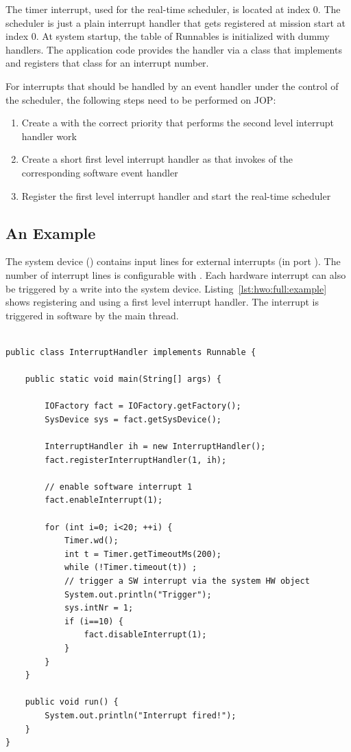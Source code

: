 The timer interrupt, used for the real-time scheduler, is located at
index 0. The scheduler is just a plain interrupt handler that gets
registered at mission start at index 0. At system startup, the table
of Runnables is initialized with dummy handlers. The application code
provides the handler via a class that implements  and
registers that class for an interrupt number.

For interrupts that should be handled by an event handler under the
control of the scheduler, the following steps need to be performed on
JOP:
\begin{enumerate}
  \item Create a  with the correct priority that
      performs the second level interrupt handler work
  \item Create a short first level interrupt handler as
       that invokes  of the
      corresponding software event handler
  \item Register the first level interrupt handler and start the
      real-time scheduler
\end{enumerate}


\subsection{An Example}

The system device () contains input lines for
external interrupts (in port ). The number of interrupt
lines is configurable with . Each hardware
interrupt can also be triggered by a write into the system device.
Listing~\ref{lst:hwo:full:example} shows registering and using a
first level interrupt handler. The interrupt is triggered in software
by the main thread.

\begin{lstlisting}[caption={Interrupt register/deregister methods in the factory class},
label=lst:hwo:full:example]

public class InterruptHandler implements Runnable {

    public static void main(String[] args) {

        IOFactory fact = IOFactory.getFactory();
        SysDevice sys = fact.getSysDevice();

        InterruptHandler ih = new InterruptHandler();
        fact.registerInterruptHandler(1, ih);

        // enable software interrupt 1
        fact.enableInterrupt(1);

        for (int i=0; i<20; ++i) {
            Timer.wd();
            int t = Timer.getTimeoutMs(200);
            while (!Timer.timeout(t)) ;
            // trigger a SW interrupt via the system HW object
            System.out.println("Trigger");
            sys.intNr = 1;
            if (i==10) {
                fact.disableInterrupt(1);
            }
        }
    }

    public void run() {
        System.out.println("Interrupt fired!");
    }
}
\end{lstlisting}


